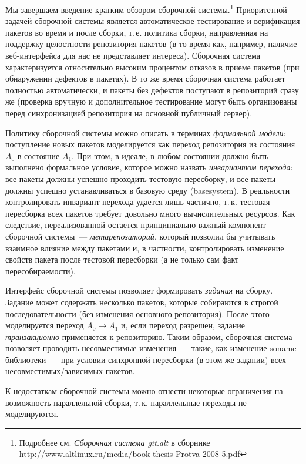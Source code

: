 \documentclass[russian,a4paper,12pt,titlepage]{article}
\begin{document}
Мы завершаем введение кратким обзором сборочной системы.\footnote{Подробнее см. \textit{Сборочная система git.alt}
в сборнике \url{http://www.altlinux.ru/media/book-thesis-Protva-2008-5.pdf}}  Приоритетной задачей сборочной системы
является автоматическое тестирование и верификация пакетов во время и после сборки, т.\,е. политика сборки, направленная
на поддержку целостности репозитория пакетов (в то время как, например, наличие веб-интерфейса для нас не представляет интереса).
Сборочная система характеризуется относительно высоким процентом отказов в приеме пакетов (при обнаружении дефектов в пакетах).
В то же время сборочная система работает полностью автоматически, и пакеты без дефектов поступают в репозиторий сразу же (проверка
вручную и дополнительное тестирование могут быть организованы перед синхронизацией репозитория на основной публичный сервер).

Политику сборочной системы можно описать в терминах \textit{формальной модели}: поступление новых пакетов моделируется
как переход репозитория из состояния $A_0$ в состояние $A_1$.  При этом, в идеале, в любом состоянии должно быть выполнено
формальное условие, которое можно назвать \textit{инвариантом перехода}: все пакеты должны успешно проходить тестовую пересборку,
и все пакеты должны успешно устанавливаться в базовую среду (basesystem).  В реальности контролировать инвариант перехода
удается лишь частично, т.\,к. тестовая пересборка всех пакетов требует довольно много вычислительных ресурсов.
Как следствие, нереализованной остается принципиально важный компонент сборочной системы~--- \textit{метарепозиторий},
который позволил бы учитывать взаимное влияние между пакетами и, в частности, контролировать изменение свойств пакета
после тестовой пересборки (а не только сам факт пересобираемости).

Интерфейс сборочной системы позволяет формировать \textit{задания} на сборку.  Задание может содержать несколько
пакетов, которые собираются в строгой последовательности (без изменения основного репозитория).  После этого моделируется
переход $A_0\to A_1$ и, если переход разрешен, задание \textit{транзакционно} применяется к репозиторию.  Таким образом,
сборочная система позволяет проводить несовместимые изменения~--- такие, как изменение soname библиотеки~--- при условии
синхронной пересборки (в этом же задании) всех несовместимых/зависимых пакетов.

К недостаткам сборочной системы можно отнести некоторые ограничения на возможность параллельной сборки,
т.\,к. параллельные переходы не моделируются.
\end{document}
